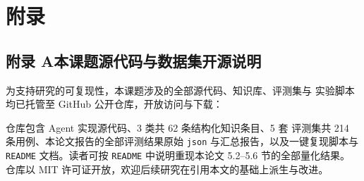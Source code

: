 \documentclass[a4paper]{article}
\newcommand{\song}{\CJKfamily{song}}
\newcommand{\xiaosihao}{\fontsize{12pt}{18pt}\selectfont}
\newcommand\seccontent{
	\song
	\xiaosihao %
    \setlength{\parindent}{2em} %
    \setlength{\parskip}{0pt}
    }
\theoremstyle{definition}
\theoremstyle{plain}
\theoremstyle{remark}
\begin{document}
\clearpage
{}
{}

{\seccontent
\label{bibtexref}
}

\clearpage
\appendix
{}
{}
\section*{附\hspace{2em}录}
\label{sec:appendix}

\subsection*{附录 A\quad 本课题源代码与数据集开源说明}

为支持研究的可复现性，本课题涉及的全部源代码、知识库、评测集与
实验脚本均已托管至 GitHub 公开仓库，开放访问与下载：

\begin{center}
\end{center}

仓库包含 Agent 实现源代码、3 类共 62 条结构化知识条目、5 套
评测集共 214 条用例、本论文报告的全部评测结果原始 \texttt{json}
与汇总报告，以及一键复现脚本与 \texttt{README} 文档。读者可按
\texttt{README} 中说明重现本论文 5.2--5.6 节的全部量化结果。
仓库以 MIT 许可证开放，欢迎后续研究在引用本文的基础上派生与改进。
\end{document}
